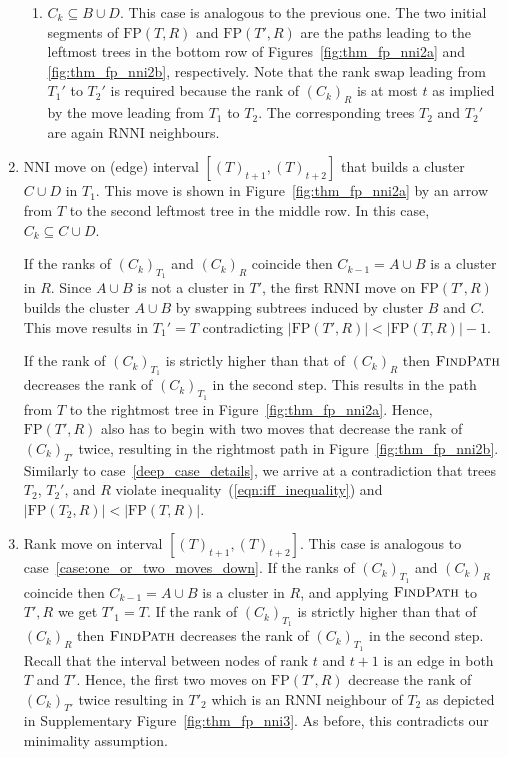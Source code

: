 \documentclass[11pt]{amsart}
\newcommand{\rnni}{\mathrm{RNNI}}
\newcommand{\findpath}{\textsc{FindPath}}
\newcommand{\nni}{\mathrm{NNI}}
\newcommand{\fp}{\mathrm{FP}}
\begin{document}
\begin{enumerate}[label = 1.{\arabic*}]
\begin{enumerate}[label = \theenumi.\arabic*]
\item $C_k \subseteq B \cup D$.
This case is analogous to the previous one.
The two initial segments of $\fp(T, R)$ and $\fp(T', R)$ are the paths leading to the leftmost trees in the bottom row of Figures~\ref{fig:thm_fp_nni2a} and \ref{fig:thm_fp_nni2b}, respectively.
Note that the rank swap leading from $T_1'$ to $T_2'$ is required because the rank of $(C_k)_R$ is at most $t$ as implied by the move leading from $T_1$ to $T_2$.
The corresponding trees $T_2$ and $T_2'$ are again $\rnni$ neighbours.
\end{enumerate}

\item $\nni$ move on (edge) interval $[(T)_{t+1}, (T)_{t+2}]$ that builds a cluster $C \cup D$ in $T_1$.
\label{case:one_or_two_moves_down}
This move is shown in Figure~\ref{fig:thm_fp_nni2a} by an arrow from $T$ to the second leftmost tree in the middle row.
In this case, $C_k \subseteq C \cup D$.

If the ranks of $(C_k)_{T_1}$ and $(C_k)_R$ coincide then $C_{k-1} = A \cup B$ is a cluster in $R$.
Since $A \cup B$ is not a cluster in $T'$, the first $\rnni$ move on $\fp(T', R)$ builds the cluster $A \cup B$ by swapping subtrees induced by cluster $B$ and $C$.
This move results in $T_1' = T$ contradicting $|\fp(T',R)| < |\fp(T,R)| - 1$.

If the rank of $(C_k)_{T_1}$ is strictly higher than that of $(C_k)_R$ then $\findpath$ decreases the rank of $(C_k)_{T_1}$ in the second step.
This results in the path from $T$ to the rightmost tree in Figure~\ref{fig:thm_fp_nni2a}.
Hence, $\fp(T', R)$ also has to begin with two moves that decrease the rank of $(C_k)_{T'}$ twice, resulting in the rightmost path in Figure~\ref{fig:thm_fp_nni2b}.
Similarly to case~\ref{deep_case_details}, we arrive at a contradiction that trees $T_2$, $T_2'$, and $R$ violate inequality~(\ref{eqn:iff_inequality}) and $|\fp(T_2,R)| < |\fp(T,R)|$.

\item Rank move on interval $[(T)_{t+1},(T)_{t+2}]$.
\label{case:rank_move_interval_above}
This case is analogous to case~\ref{case:one_or_two_moves_down}.
If the ranks of $(C_k)_{T_1}$ and $(C_k)_R$ coincide then $C_{k-1} = A \cup B$ is a cluster in $R$, and applying $\findpath$ to $T', R$ we get $T'_1 = T$.
If the rank of $(C_k)_{T_1}$ is strictly higher than that of $(C_k)_R$ then $\findpath$ decreases the rank of $(C_k)_{T_1}$ in the second step.
Recall that the interval between nodes of rank $t$ and $t+1$ is an edge in both $T$ and $T'$.
Hence, the first two moves on $\fp(T', R)$ decrease the rank of $(C_k)_{T'}$ twice resulting in $T'_2$ which is an $\rnni$ neighbour of $T_2$ as depicted in Supplementary Figure~\ref{fig:thm_fp_nni3}.
As before, this contradicts our minimality assumption.


\end{enumerate}
\end{document}
